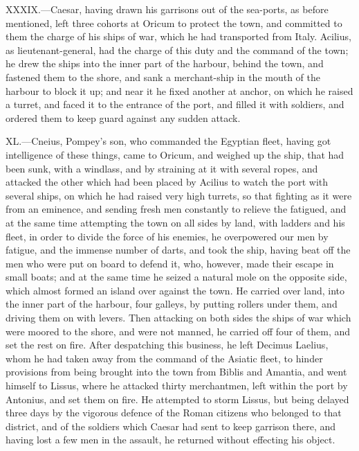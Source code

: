 XXXIX.—Caesar, having drawn his garrisons out of the sea-ports, as
before mentioned, left three cohorts at Oricum to protect the town, and
committed to them the charge of his ships of war, which he had
transported from Italy. Acilius, as lieutenant-general, had the charge
of this duty and the command of the town; he drew the ships into the
inner part of the harbour, behind the town, and fastened them to the
shore, and sank a merchant-ship in the mouth of the harbour to block it
up; and near it he fixed another at anchor, on which he raised a turret,
and faced it to the entrance of the port, and filled it with soldiers,
and ordered them to keep guard against any sudden attack.

XL.—Cneius, Pompey's son, who commanded the Egyptian fleet, having got
intelligence of these things, came to Oricum, and weighed up the ship,
that had been sunk, with a windlass, and by straining at it with several
ropes, and attacked the other which had been placed by Acilius to watch
the port with several ships, on which he had raised very high turrets,
so that fighting as it were from an eminence, and sending fresh men
constantly to relieve the fatigued, and at the same time attempting the
town on all sides by land, with ladders and his fleet, in order to
divide the force of his enemies, he overpowered our men by fatigue, and
the immense number of darts, and took the ship, having beat off the men
who were put on board to defend it, who, however, made their escape in
small boats; and at the same time he seized a natural mole on the
opposite side, which almost formed an island over against the town. He
carried over land, into the inner part of the harbour, four galleys, by
putting rollers under them, and driving them on with levers. Then
attacking on both sides the ships of war which were moored to the shore,
and were not manned, he carried off four of them, and set the rest on
fire. After despatching this business, he left Decimus Laelius, whom he
had taken away from the command of the Asiatic fleet, to hinder
provisions from being brought into the town from Biblis and Amantia, and
went himself to Lissus, where he attacked thirty merchantmen, left
within the port by Antonius, and set them on fire. He attempted to storm
Lissus, but being delayed three days by the vigorous defence of the
Roman citizens who belonged to that district, and of the soldiers which
Caesar had sent to keep garrison there, and having lost a few men in the
assault, he returned without effecting his object.

